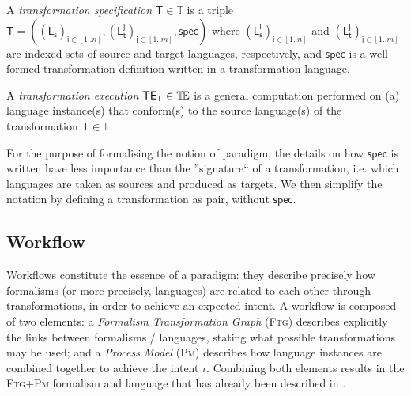 \begin{Definition}
   A \emph{transformation specification} $\mathsf{T}\in\mathbb{T}$ is a triple 
$\mathsf{T} = ((\mathsf{L_s^{i}})_{\mathsf{i}\in [1..n]}, 
(\mathsf{L_t^{j}})_{\mathsf{j}\in[1..m]}, \mathsf{spec})$ where  
$(\mathsf{L_s^{i}})_{\mathsf{i}\in [1..n]}$ and
$(\mathsf{L_t^{j}})_{\mathsf{j}\in [1..m]}$ are indexed sets of source and
target languages, respectively, and $\mathsf{spec}$ is a well-formed 
transformation definition written in a transformation language.

   A \emph{transformation execution} $\mathsf{TE_{T}}\in\mathbb{T}\!\mathbb{E}$ is a general 
computation performed on (a) language instance(s) that conform(s) to the source 
language(s) of the transformation $\mathsf{T}\in\mathbb{T}$.
\end{Definition}
For the purpose of formalising the notion of paradigm, the details on how 
$\mathsf{spec}$ is written have less importance than the ''signature`` of 
a transformation, i.e. which languages are taken as sources and produced as 
targets. We then simplify the notation by defining a transformation as pair, 
without $\mathsf{spec}$.





\subsection{Workflow}
\label{sec:Workflow}

Workflows constitute the essence of a paradigm: they describe precisely how 
formalisms (or more precisely, languages) are related to each other through 
transformations, in order to achieve an expected intent. 
A workflow is composed of two elements: a \emph{Formalism Transformation Graph} 
(\textsc{Ftg}) describes explicitly the links between formalisms / languages, 
stating what possible transformations may be used; and a \emph{Process Model} 
(\textsc{Pm}) describes how language instances are 
combined together to achieve the intent $\iota$. Combining both elements 
results in the \textsc{Ftg+Pm} formalism and language that has already been 
described in \cite{}.

